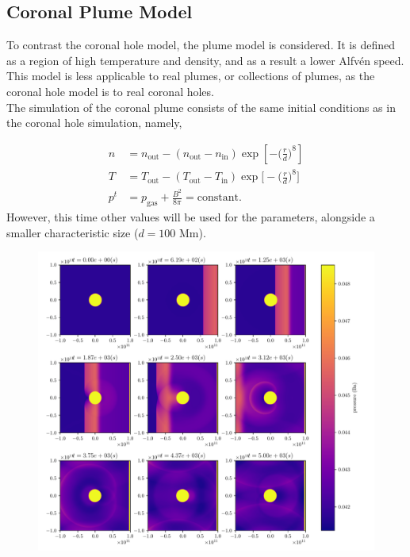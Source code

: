 \documentclass[a4paper]{article}
\begin{document}
\subsection{Coronal Plume Model} 
To contrast the coronal hole model, the plume model is considered. 
It is defined as a region of high temperature and density, and as a result a lower Alfv\'en speed.
This model is less applicable to real plumes, or collections of plumes, as the coronal hole model is to real coronal holes.\\

The simulation of the coronal plume consists of the same initial conditions as in the coronal hole simulation, namely,

\begin{align*}
    n &= n_{\text{out}} - (n_{\text{out}}-n_{\text{in}})\exp\left[-\bigg(\frac{r}{d}\bigg)^8\right]\\
    T &= T_{\text{out}} - (T_{\text{out}}-T_{\text{in}})\exp\bigg[-\bigg(\frac{r}{d}\bigg)^8\bigg]\\
     p^t &= p_{\text{gas}} + \frac{B^2}{8\pi} = \text{constant}.
\end{align*}
However, this time other values will be used for the parameters, alongside a smaller characteristic size ($d = 100$ Mm).
\begin{figure}[h]
	\centering
	\includegraphics[width=1\textwidth]{figures/plume_time.pdf}
	\caption{}
	\label{fig:figures-plume_time-pdf}
\end{figure}
\end{document}

